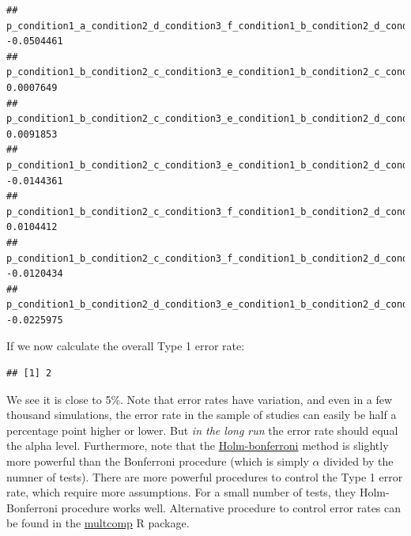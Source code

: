 \documentclass[]{book}
\newenvironment{Shaded}{\begin{snugshade}}{\end{snugshade}}
\newcommand{\ControlFlowTok}[1]{\textcolor[rgb]{0.13,0.29,0.53}{\textbf{#1}}}
\newcommand{\DecValTok}[1]{\textcolor[rgb]{0.00,0.00,0.81}{#1}}
\newcommand{\KeywordTok}[1]{\textcolor[rgb]{0.13,0.29,0.53}{\textbf{#1}}}
\newcommand{\NormalTok}[1]{#1}
\newcommand{\OperatorTok}[1]{\textcolor[rgb]{0.81,0.36,0.00}{\textbf{#1}}}
\newcommand{\StringTok}[1]{\textcolor[rgb]{0.31,0.60,0.02}{#1}}
\begin{document}
\begin{verbatim}
## p_condition1_a_condition2_d_condition3_f_condition1_b_condition2_d_condition3_f  -0.0504461
## p_condition1_b_condition2_c_condition3_e_condition1_b_condition2_c_condition3_f   0.0007649
## p_condition1_b_condition2_c_condition3_e_condition1_b_condition2_d_condition3_e   0.0091853
## p_condition1_b_condition2_c_condition3_e_condition1_b_condition2_d_condition3_f  -0.0144361
## p_condition1_b_condition2_c_condition3_f_condition1_b_condition2_d_condition3_e   0.0104412
## p_condition1_b_condition2_c_condition3_f_condition1_b_condition2_d_condition3_f  -0.0120434
## p_condition1_b_condition2_d_condition3_e_condition1_b_condition2_d_condition3_f  -0.0225975
\end{verbatim}

If we now calculate the overall Type 1 error rate:

\begin{Shaded}
\end{Shaded}

\begin{verbatim}
## [1] 2
\end{verbatim}

We see it is close to 5\%. Note that error rates have variation, and even in a few thousand simulations, the error rate in the sample of studies can easily be half a percentage point higher or lower. But \emph{in the long run} the error rate should equal the alpha level. Furthermore, note that the \href{https://en.wikipedia.org/wiki/Holm\%E2\%80\%93Bonferroni_method}{Holm-bonferroni} method is slightly more powerful than the Bonferroni procedure (which is simply \(\alpha\) divided by the numner of tests). There are more powerful procedures to control the Type 1 error rate, which require more assumptions. For a small number of tests, they Holm-Bonferroni procedure works well. Alternative procedure to control error rates can be found in the \href{https://cran.r-project.org/web/packages/multcomp/index.html}{multcomp} R package.
\end{document}
